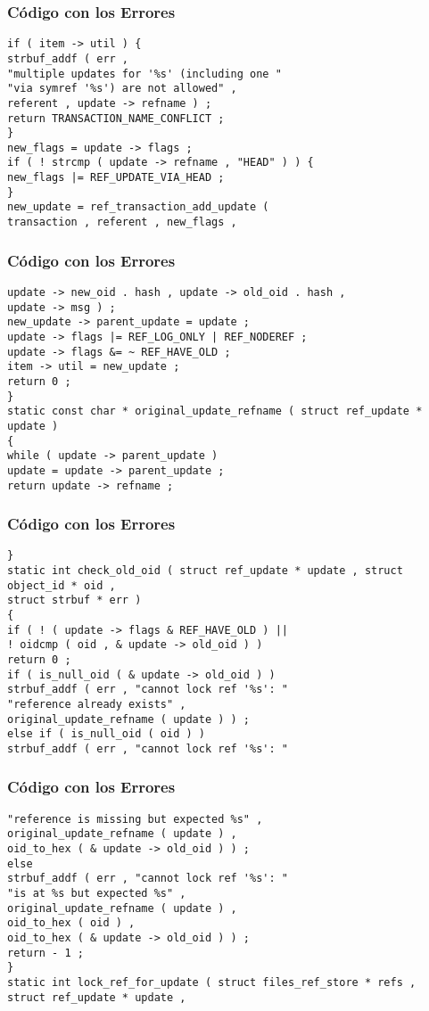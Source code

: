 \documentclass{beamer}
\begin{document}
\begin{frame}[fragile]
\frametitle{C\'odigo con los Errores}
\begin{verbatim}
if ( item -> util ) { 
strbuf_addf ( err , 
"multiple updates for '%s' (including one " 
"via symref '%s') are not allowed" , 
referent , update -> refname ) ; 
return TRANSACTION_NAME_CONFLICT ; 
} 
new_flags = update -> flags ; 
if ( ! strcmp ( update -> refname , "HEAD" ) ) { 
new_flags |= REF_UPDATE_VIA_HEAD ; 
} 
new_update = ref_transaction_add_update ( 
transaction , referent , new_flags , 
\end{verbatim}
\end{frame}
\begin{frame}[fragile]
\frametitle{C\'odigo con los Errores}
\begin{verbatim}
update -> new_oid . hash , update -> old_oid . hash , 
update -> msg ) ; 
new_update -> parent_update = update ; 
update -> flags |= REF_LOG_ONLY | REF_NODEREF ; 
update -> flags &= ~ REF_HAVE_OLD ; 
item -> util = new_update ; 
return 0 ; 
} 
static const char * original_update_refname ( struct ref_update * update ) 
{ 
while ( update -> parent_update ) 
update = update -> parent_update ; 
return update -> refname ; 
\end{verbatim}
\end{frame}
\begin{frame}[fragile]
\frametitle{C\'odigo con los Errores}
\begin{verbatim}
} 
static int check_old_oid ( struct ref_update * update , struct object_id * oid , 
struct strbuf * err ) 
{ 
if ( ! ( update -> flags & REF_HAVE_OLD ) || 
! oidcmp ( oid , & update -> old_oid ) ) 
return 0 ; 
if ( is_null_oid ( & update -> old_oid ) ) 
strbuf_addf ( err , "cannot lock ref '%s': " 
"reference already exists" , 
original_update_refname ( update ) ) ; 
else if ( is_null_oid ( oid ) ) 
strbuf_addf ( err , "cannot lock ref '%s': " 
\end{verbatim}
\end{frame}
\begin{frame}[fragile]
\frametitle{C\'odigo con los Errores}
\begin{verbatim}
"reference is missing but expected %s" , 
original_update_refname ( update ) , 
oid_to_hex ( & update -> old_oid ) ) ; 
else 
strbuf_addf ( err , "cannot lock ref '%s': " 
"is at %s but expected %s" , 
original_update_refname ( update ) , 
oid_to_hex ( oid ) , 
oid_to_hex ( & update -> old_oid ) ) ; 
return - 1 ; 
} 
static int lock_ref_for_update ( struct files_ref_store * refs , 
struct ref_update * update , 
\end{verbatim}
\end{frame}
\end{document}
